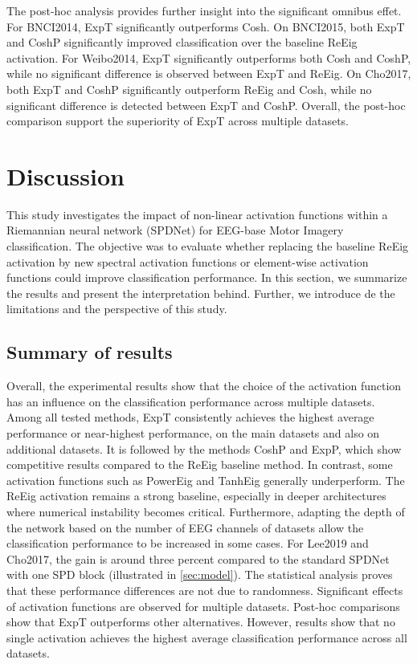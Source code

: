 \documentclass[11pt,a4paper]{article}
\begin{document}
The post-hoc analysis provides further insight into the significant omnibus effet. For BNCI2014, ExpT significantly outperforms Cosh. On BNCI2015, both ExpT and CoshP significantly improved classification over the baseline ReEig activation. For Weibo2014, ExpT significantly outperforms both Cosh and CoshP, while no significant difference is observed between ExpT and ReEig. On Cho2017, both ExpT and CoshP significantly outperform ReEig and Cosh, while no significant difference is detected between ExpT and CoshP. Overall, the post-hoc comparison support the superiority of ExpT across multiple datasets.

\newpage
\section{Discussion}
This study investigates the impact of non-linear activation functions within a Riemannian neural network (SPDNet) for EEG-base Motor Imagery classification. The objective was to evaluate whether replacing the baseline ReEig activation by new spectral activation functions or element-wise activation functions could improve classification performance. In this section, we summarize the results and present the interpretation behind. Further, we introduce de the limitations and the perspective of this study.\\

\subsection{Summary of results}
Overall, the experimental results show that the choice of the activation function has an influence on the classification performance across multiple datasets. Among all tested methods, ExpT consistently achieves the highest average performance or near-highest performance, on the main datasets and also on additional datasets. It is followed by the methods CoshP and ExpP, which show competitive results compared to the ReEig baseline method. 
In contrast, some activation functions such as PowerEig and TanhEig  generally underperform. The ReEig activation remains a strong baseline, especially in deeper architectures where numerical instability becomes critical. 
Furthermore, adapting the depth of the network based on the number of EEG channels of datasets allow the classification performance to be increased in some cases. For Lee2019 and Cho2017, the gain is around three percent compared to the standard SPDNet with one SPD block (illustrated in \ref{sec:model}).
The statistical analysis proves that these performance differences are not due to randomness. Significant effects of activation functions are observed for multiple datasets. Post-hoc comparisons show that ExpT outperforms other alternatives. 
However, results show that no single activation achieves the highest average classification performance across all datasets.
\end{document}
